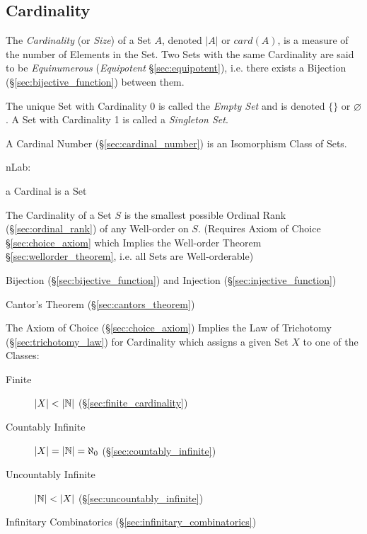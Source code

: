 \subsection{Cardinality}\label{sec:cardinality}

The \emph{Cardinality} (or \emph{Size}) of a Set $A$, denoted $|A|$ or
$card(A)$, is a measure of the number of Elements in the Set. Two Sets with the
same Cardinality are said to be \emph{Equinumerous} (\emph{Equipotent}
\S\ref{sec:equipotent}), i.e. there exists a Bijection
(\S\ref{sec:bijective_function}) between them.

The unique Set with Cardinality 0 is called the \emph{Empty Set} and
is denoted $\{\}$ or $\varnothing$. A Set with Cardinality 1 is called a
\emph{Singleton Set}.

A Cardinal Number (\S\ref{sec:cardinal_number}) is an Isomorphism
Class of Sets.

nLab:

a Cardinal is a Set

The Cardinality of a Set $S$ is the smallest possible Ordinal Rank
(\S\ref{sec:ordinal_rank}) of any Well-order on $S$. (Requires Axiom
of Choice \S\ref{sec:choice_axiom} which Implies the Well-order
Theorem \S\ref{sec:wellorder_theorem}, i.e. all Sets are
Well-orderable)

Bijection (\S\ref{sec:bijective_function}) and Injection
(\S\ref{sec:injective_function})

Cantor's Theorem (\S\ref{sec:cantors_theorem})

The Axiom of Choice (\S\ref{sec:choice_axiom}) Implies the Law of
Trichotomy (\S\ref{sec:trichotomy_law}) for Cardinality which assigns
a given Set $X$ to one of the Classes:

\begin{description}
\item [Finite] $|X| < |\mathbb{N}|$ (\S\ref{sec:finite_cardinality})
\item [Countably Infinite] $|X| = |\mathbb{N}| = \aleph_0$
  (\S\ref{sec:countably_infinite})
\item [Uncountably Infinite] $|\mathbb{N}| < |X|$
  (\S\ref{sec:uncountably_infinite})
\end{description}

Infinitary Combinatorics (\S\ref{sec:infinitary_combinatorics})


\asterism


